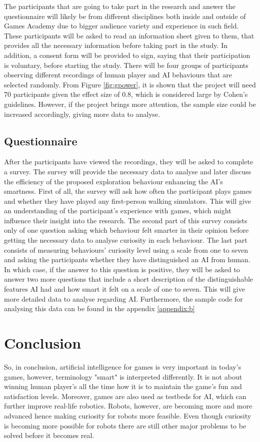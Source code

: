 \documentclass[journal]{IEEEtran}
\begin{document}
The participants that are going to take part in the research and answer the questionnaire will likely be from different disciplines both inside and outside of Games Academy due to bigger audience variety and experience in such field. These participants will be asked to read an information sheet given to them, that provides all the necessary information before taking part in the study. In addition, a consent form will be provided to sign, saying that their participation is voluntary, before starting the study. There will be four groups of participants observing different recordings of human player and AI behaviours that are selected randomly. From Figure \ref{fig:gpower}, it is shown that the project will need 70 participants given the effect size of 0.8, which is considered large by Cohen's guidelines. However, if the project brings more attention, the sample size could be increased accordingly, giving more data to analyse. %

\subsection{Questionnaire} %
After the participants have viewed the recordings, they will be asked to complete a survey. The survey will provide the necessary data to analyse and later discuss the efficiency of the proposed exploration behaviour enhancing the AI's smartness. First of all, the survey will ask how often the participant plays games and whether they have played any first-person walking simulators. This will give an understanding of the participant's experience with games, which might influence their insight into the research. The second part of this survey consists only of one question asking which behaviour felt smarter in their opinion before getting the necessary data to analyse curiosity in each behaviour. The last part consists of measuring behaviours' curiosity level using a scale from one to seven and asking the participants whether they have distinguished an AI from human. In which case, if the answer to this question is positive, they will be asked to answer two more questions that include a short description of the distinguishable features AI had and how smart it felt on a scale of one to seven. This will give more detailed data to analyse regarding AI. Furthermore, the sample code for analysing this data can be found in the appendix \ref{appendix:b}

\section{Conclusion} %
So, in conclusion, artificial intelligence for games is very important in today's games, however, terminology "smart" is interpreted differently. It is not about winning human player's all the time how it is to maintain the game's fun and satisfaction levels. Moreover, games are also used as testbeds for AI, which can further improve real-life robotics. Robots, however, are becoming more and more advanced hence making curiosity for robots more feasible. Even though curiosity is becoming more possible for robots there are still other major problems to be solved before it becomes real.
\end{document}
